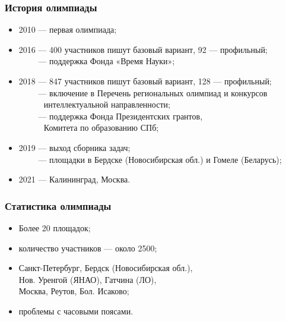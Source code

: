 

\begin{frame}\frametitle{История олимпиады}
\begin{itemize}
	\item 2010 — первая олимпиада;
	\item 2016 — 400 участников пишут базовый вариант, 92 --- профильный;\\
        $\phantom{2016}$ — поддержка Фонда «Время Науки»;
	\item 2018 — 847 участников пишут базовый вариант, 128 --- профильный;\\
        $\phantom{2018}$ — включение в Перечень региональных олимпиад и конкурсов\\
	$\phantom{2018 — }$\quad интеллектуальной направленности;\\
	$\phantom{2018}$ — поддержка Фонда Президентских грантов,\\
	$\phantom{2018 — }$\quad Комитета по образованию СПб;\\
	\item 2019 — выход сборника задач;\\
        $\phantom{2019}$ — площадки в Бердске (Новосибирская обл.) и Гомеле (Беларусь);\\
	\item 2021 — Калининград, Москва.
\end{itemize}\end{frame}

\begin{frame}\frametitle{Статистика олимпиады}
\begin{itemize}
	\item Более 20 площадок;\\
	\item количество участников --- около 2500;\\
	\item Санкт-Петербург, Бердск (Новосибирская обл.), \\
		Нов. Уренгой (ЯНАО), Гатчина (ЛО), \\
		Москва, Реутов, Бол. Исаково;\\
	\item проблемы с часовыми поясами.
\end{itemize}\end{frame}
